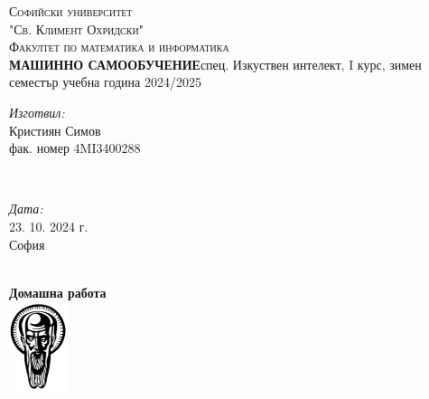 \documentclass[12pt]{article}
\begin{document}
	\begin{titlepage}	
		\newcommand{\HRule}{\rule{\linewidth}{0.5mm}} %
		\center
		\textsc{\LARGE Софийски университет }\\[0.3cm]
		\textsc{\LARGE "Св. Климент Охридски" }\\[0.3cm]
		\textsc{\Large Факултет по математика и информатика }\\[0.2cm]
		
		{\fontsize{12}{18}\selectfont \bf МАШИННО САМООБУЧЕНИЕ}\vspace{15pt}\newline спец. Изкуствен интелект, I курс, зимен семестър \newline учебна година 2024/2025
		\vspace{30pt}
		
		
		
		
		\begin{minipage}{0.4\textwidth}
			\begin{flushleft}\large
				\emph{Изготвил:} \\
				Кристиян Симов \\ 
				фак. номер 4MI3400288
			\end{flushleft}
		\end{minipage}
		~
		\begin{minipage}{0.4\textwidth}
			\begin{flushright}
				\large
				\emph{Дата:}\\
				23. 10. 2024 г. %
				\\София 
			\end{flushright}
		\end{minipage}\\[1cm]
		\bigskip
		{\large \textbf{Домашна работа }}\\[1cm] %
		\includegraphics{logo_su_no_text.png}\\[1cm]
		\vfill %
	\end{titlepage}
	
\end{document}
